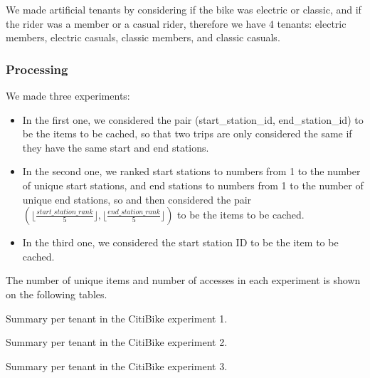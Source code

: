 We made artificial tenants by considering if the bike was electric or classic, and if the rider 
was a member or a casual rider, therefore we have 4 tenants: electric members, electric casuals,
classic members, and classic casuals.

\subsubsection{Processing}

We made three experiments: 

\begin{itemize}
    \item In the first one, we considered the pair (start\_station\_id, end\_station\_id) to be 
    the items to be cached, so that two trips are only considered the same if they have the 
    same start and end stations.
    \item In the second one, we ranked start stations to numbers from 1 to the number of unique
    start stations, and end stations to numbers from 1 to the number of unique end stations, so
    and then considered the pair $(\lfloor \frac{start\_station\_rank}{5} \rfloor, \lfloor \frac{end\_station\_rank}{5} \rfloor)$ 
    to be the items to be cached.
    \item In the third one, we considered the start station ID to be the item to be cached.
\end{itemize}

The number of unique items and number of accesses in each experiment is shown on the following tables.

\newpage

\begin{table}[ht]
    \centering
    \small
    \caption{Summary per tenant in the CitiBike experiment 1.}
    \label{tab:citibike-exp-1-case-2-summary}
\end{table}

\begin{table}[ht]
    \centering
    \small
    \caption{Summary per tenant in the CitiBike experiment 2.}
    \label{tab:citibike-exp-2-case-3-summary}
\end{table}

\begin{table}[ht]
    \centering
    \small
    \caption{Summary per tenant in the CitiBike experiment 3.}
    \label{tab:citibike-exp-3-case-4-summary}
\end{table}

